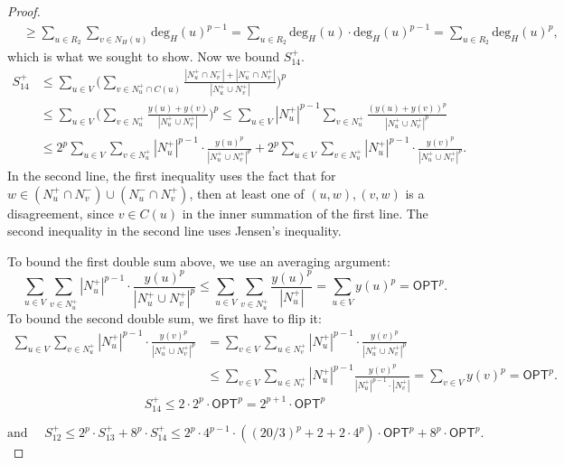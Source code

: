 \begin{proof}
\begin{align*}
    &\geq \sum_{u \in R_2} \sum_{v \in N_H(u)} \text{deg}_H(u)^{p-1} 
    = \sum_{u \in R_2} \text{deg}_H(u) \cdot \text{deg}_H(u)^{p-1} 
    = \sum_{u \in R_2} \text{deg}_H(u)^{p},
\end{align*}
 which is what we sought to show.
Now we bound $S_{14}^+$. 
\begin{align*}
    S_{14}^+ &\leq \sum_{u \in V} \Bigg(\sum_{v \in N_u^+ \cap C(u)} \frac{|N_u^+ \cap N_v^-| + |N_u^- \cap N_v^+|}{|N_u^+ \cup N_v^+|} \Bigg)^p \\
    &\leq \sum_{u \in V} \Bigg(\sum_{v \in N_u^+} \frac{y(u) + y(v)}{|N_u^+ \cup N_v^+|} \Bigg)^p 
    \leq \sum_{u \in V} |N_u^+|^{p-1} \sum_{v \in N_u^+} \frac{(y(u) + y(v))^p}{|N_u^+ \cup N_v^+|^p} \\
    &\leq 2^p\sum_{u \in V}\sum_{v \in N_u^+} |N_u^+|^{p-1} \cdot \frac{y(u)^p}{|N_u^+ \cup N_v^+|^p} + 2^p\sum_{u \in V}\sum_{v \in N_u^+} |N_u^+|^{p-1} \cdot \frac{y(v)^p}{|N_u^+ \cup N_v^+|^p}. 
\end{align*}
In the second line, the first inequality uses the fact that for $w \in (N_u^+ \cap N_v^-) \cup (N_u^- \cap N_v^+)$, then at least one of $(u,w), (v,w)$ is a disagreement, since $v \in C(u)$ in the inner summation of the first line. The second inequality in the second line uses Jensen's inequality. 

To bound the first double sum above, we use an averaging argument:
$$\sum_{u \in V}\sum_{v \in N_u^+} |N_u^+|^{p-1} \cdot \frac{y(u)^p}{|N_u^+ \cup N_v^+|^p} \leq \sum_{u \in V} \sum_{v \in N_u^+} \frac{y(u)^p}{|N_u^+|} = \sum_{u \in V} y(u)^p = \textsf{OPT}^p.$$
To bound the second double sum, we first have to flip it:
\begin{align*}
\sum_{u \in V}\sum_{v \in N_u^+} |N_u^+|^{p-1} \cdot \frac{y(v)^p}{|N_u^+ \cup N_v^+|^p} &= \sum_{v \in V} \sum_{u \in N_v^+} |N_u^+|^{p-1} \cdot \frac{y(v)^p}{|N_u^+ \cup N_v^+|^p} \\
&\leq \sum_{v \in V} \sum_{u \in N_v^+} |N_u^+|^{p-1} \frac{y(v)^p}{|N_u^+|^{p-1} \cdot |N_v^+|} 
= \sum_{v \in V} y(v)^p = \textsf{OPT}^p.
\end{align*}
$$\boxed{S_{14}^+ \leq 2 \cdot 2^p \cdot \textsf{OPT}^p = 2^{p+1} \cdot \textsf{OPT}^p}$$ 

$$\text{and } \quad\boxed{S_{12}^+ \leq 2^p \cdot S_{13}^+ + 8^p \cdot S_{14}^+ \leq 2^p \cdot 4^{p-1} \cdot \left((20/3)^p + 2 + 2 \cdot 4^p \right) \cdot \textsf{OPT}^p + 8^p \cdot \textsf{OPT}^p.}$$





\end{proof}
